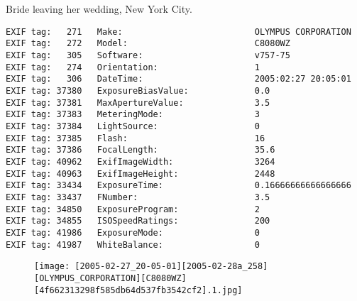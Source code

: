 \section{\protect{}}
\noindent Bride leaving her wedding, New York City.
\noindent
\begin{lstlisting}
EXIF tag:   271   Make:                          OLYMPUS CORPORATION
EXIF tag:   272   Model:                         C8080WZ
EXIF tag:   305   Software:                      v757-75
EXIF tag:   274   Orientation:                   1
EXIF tag:   306   DateTime:                      2005:02:27 20:05:01
EXIF tag: 37380   ExposureBiasValue:             0.0
EXIF tag: 37381   MaxApertureValue:              3.5
EXIF tag: 37383   MeteringMode:                  3
EXIF tag: 37384   LightSource:                   0
EXIF tag: 37385   Flash:                         16
EXIF tag: 37386   FocalLength:                   35.6
EXIF tag: 40962   ExifImageWidth:                3264
EXIF tag: 40963   ExifImageHeight:               2448
EXIF tag: 33434   ExposureTime:                  0.16666666666666666
EXIF tag: 33437   FNumber:                       3.5
EXIF tag: 34850   ExposureProgram:               2
EXIF tag: 34855   ISOSpeedRatings:               200
EXIF tag: 41986   ExposureMode:                  0
EXIF tag: 41987   WhiteBalance:                  0

\end{lstlisting}
\clearpage
\begin{figure}
\raggedleft
\texttt{[image: [2005-02-27\_20-05-01][2005-02-28a\_258][OLYMPUS\_CORPORATION][C8080WZ][4f662313298f585db64d537fb3542cf2].1.jpg]}
\end{figure}


\clearpage
